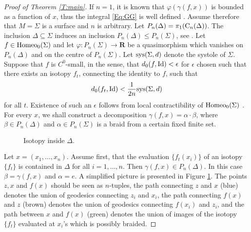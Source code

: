 \documentclass[11pt]{amsart}
\theoremstyle{definition}
\theoremstyle{remark}
\numberwithin{equation}{section}
\numberwithin{figure}{section}
\newcommand{\B}[1]{{\mathbf #1}}
\begin{document}
\begin{proof}[Proof of Theorem \ref{T:main}]
If $n=1$, it is known that $\varphi(\gamma(f,x))$ is bounded as a function of $x$, thus the integral \eqref{Eq:GG} is well defined 
\cite{BK-frag}. Assume therefore that $M = \Sigma$ is a surface and $n$ is arbitrary.
Let $P_n(\Delta) = \pi_1({\rm C}_n(\Delta))$. 
The inclusion $\Delta\subseteq \Sigma$ induces an inclusion $P_n(\Delta)\leq P_n(\Sigma)$, see \cite[Theorem 1]{MR334182}.
Let $f\in {\rm Homeo}_0(\Sigma)$ and let 
$\varphi\colon P_n(\Sigma)\to \B R$ be a quasimorphism which
vanishes on $P_n(\Delta)$ and on the centre of $P_n(\Sigma)$. 
Let  ${\rm sys}(\Sigma,d)$ denote the systole of $\Sigma$.
Suppose that $f$ is $C^0$-small, in the sense, that
$d_0(f,{\rm Id}) < \epsilon$
for $\epsilon$ chosen such that there exists an isotopy $f_t$, connecting the identity to $f$, such that 
$$d_0(f_t,{\rm Id}) < \frac{1}{2n}{\rm sys}(\Sigma,d)$$ 
for all $t$. Existence of such an $\epsilon$ follows from local 
contractibility of ${\rm Homeo}_0(\Sigma)$ \cite[Corollary 1.1]{zbMATH03341019}. 
For every $x$, we shall construct a decomposition $\gamma(f,x) = \alpha\cdot\beta$,
where $\beta \in P_n(\Delta)$ and $\alpha\in P_n(\Sigma)$ is a braid from a certain fixed finite set. 

\begin{figure}[h]
\centering
{}
\caption{Isotopy inside $\Delta$.}
\label{F:in-delta}
\end{figure}
Let $x=(x_1,\ldots,x_n)$. Assume first, that the evaluation
$\{f_t(x_i)\}$ of an isotopy $\{f_t\}$ is contained in $\Delta$ for all
$i=1,\ldots,n$. Then $\gamma(f,x)\in P_n(\Delta)$. 
In this case $\beta = \gamma(f,x)$ and $\alpha = e$. A simplified picture
is presented in Figure \ref{F:in-delta}. The points $z,x$ and $f(x)$
should be seen as $n$-tuples, the path connecting $z$ and $x$ (blue) denotes the union of geodesics connecting $z_i$ and $x_i$, the path connecting $f(x)$ and $z$ (brown) denotes the union of geodesics
connecting $f(x_i)$ and $z_i$, and the path between $x$ and $f(x)$ (green) denotes the union of images of the isotopy
$\{f_t\}$ evaluated at $x_i$'s which is possibly braided.


\end{proof}
\end{document}
